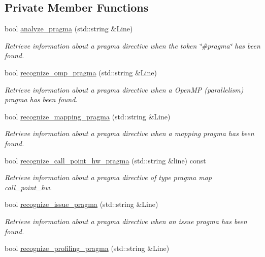 \subsection*{Private Member Functions}
\begin{DoxyCompactItemize}
\item 
bool \hyperlink{classPragmaParser_ab8df876c3d71e8de2ff0b60a00d68c3b}{analyze\+\_\+pragma} (std\+::string \&Line)
\begin{DoxyCompactList}\small\item\em Retrieve information about a pragma directive when the token \char`\"{}\#pragma\char`\"{} has been found. \end{DoxyCompactList}\item 
bool \hyperlink{classPragmaParser_abfa77814950337fb487e7e10fa12e696}{recognize\+\_\+omp\+\_\+pragma} (std\+::string \&Line)
\begin{DoxyCompactList}\small\item\em Retrieve information about a pragma directive when a Open\+MP (parallelism) pragma has been found. \end{DoxyCompactList}\item 
bool \hyperlink{classPragmaParser_a56dfb19826945b520fbfb880bf3c1442}{recognize\+\_\+mapping\+\_\+pragma} (std\+::string \&Line)
\begin{DoxyCompactList}\small\item\em Retrieve information about a pragma directive when a mapping pragma has been found. \end{DoxyCompactList}\item 
bool \hyperlink{classPragmaParser_a74e5f7f8d176b4b1b1d86a06a629d360}{recognize\+\_\+call\+\_\+point\+\_\+hw\+\_\+pragma} (std\+::string \&line) const
\begin{DoxyCompactList}\small\item\em Retrieve information about a pragma directive of type pragma map call\+\_\+point\+\_\+hw. \end{DoxyCompactList}\item 
bool \hyperlink{classPragmaParser_a21060de0d17913f42fd0b4b7472b243c}{recognize\+\_\+issue\+\_\+pragma} (std\+::string \&Line)
\begin{DoxyCompactList}\small\item\em Retrieve information about a pragma directive when an issue pragma has been found. \end{DoxyCompactList}\item 
bool \hyperlink{classPragmaParser_aef9121fb371f00bf01e8e2be3f2c6b55}{recognize\+\_\+profiling\+\_\+pragma} (std\+::string \&Line)

\end{DoxyCompactItemize}
